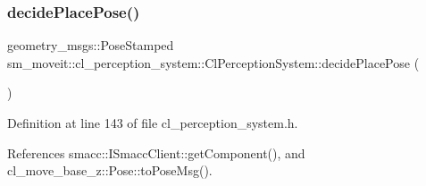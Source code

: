 \subsubsection{\texorpdfstring{decide\+Place\+Pose()}{decidePlacePose()}}
{\footnotesize\ttfamily geometry\+\_\+msgs\+::\+Pose\+Stamped sm\+\_\+moveit\+::cl\+\_\+perception\+\_\+system\+::\+Cl\+Perception\+System\+::decide\+Place\+Pose (\begin{DoxyParamCaption}{ }\end{DoxyParamCaption})\hspace{0.3cm}{\ttfamily [inline]}}



Definition at line 143 of file cl\+\_\+perception\+\_\+system.\+h.



References smacc\+::\+I\+Smacc\+Client\+::get\+Component(), and cl\+\_\+move\+\_\+base\+\_\+z\+::\+Pose\+::to\+Pose\+Msg().


